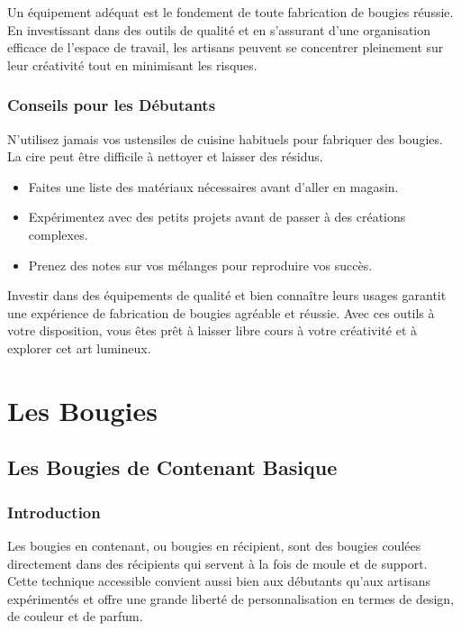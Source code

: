 \documentclass[11pt,fleqn,onecolumn,oneside]{book}
\begin{document}
\begin{remark}
Un équipement adéquat est le fondement de toute fabrication de bougies réussie. En investissant dans des outils de qualité et en s’assurant d’une organisation efficace de l’espace de travail, les artisans peuvent se concentrer pleinement sur leur créativité tout en minimisant les risques. 
\end{remark}

\section{Conseils pour les Débutants}

\begin{remark}
N’utilisez jamais vos ustensiles de cuisine habituels pour fabriquer des bougies. La cire peut être difficile à nettoyer et laisser des résidus.
\end{remark}

\begin{itemize}
    \item Faites une liste des matériaux nécessaires avant d’aller en magasin.
    \item Expérimentez avec des petits projets avant de passer à des créations complexes.
    \item Prenez des notes sur vos mélanges pour reproduire vos succès.
\end{itemize}

\begin{corollary}
Investir dans des équipements de qualité et bien connaître leurs usages garantit une expérience de fabrication de bougies agréable et réussie. Avec ces outils à votre disposition, vous êtes prêt à laisser libre cours à votre créativité et à explorer cet art lumineux.
\end{corollary}

\part{Les Bougies}
\chapter{Les Bougies de Contenant Basique}

\section{Introduction}

Les bougies en contenant, ou bougies en récipient, sont des bougies coulées directement dans des récipients qui servent à la fois de moule et de support. Cette technique accessible convient aussi bien aux débutants qu'aux artisans expérimentés et offre une grande liberté de personnalisation en termes de design, de couleur et de parfum.
\end{document}
